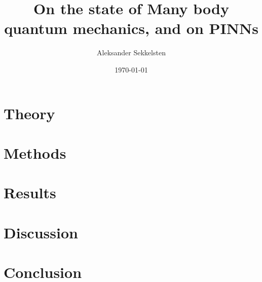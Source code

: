 \documentclass{report}
\title{On the state of Many body quantum mechanics, and on PINNs}
\author{Aleksander Sekkelsten}
\date{\today}
\begin{document}
\maketitle
\tableofcontents
\part{Theory}

\part{Methods}


\part{Results}


\part{Discussion}


\part{Conclusion}


\printbibliography
\end{document}
